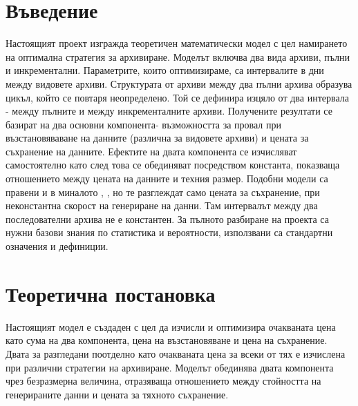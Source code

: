 \documentclass[11pt, a4paper]{article}
\theoremstyle{definition}
\begin{document}
\section{Въведение}
		Настоящият проект изгражда теоретичен математически модел с цел намирането на оптимална стратегия за архивиране. Моделът включва два вида архиви, пълни и инкрементални. Параметрите, които оптимизираме, са интервалите в дни между видовете архиви. Структурата от архиви между два пълни архива образува цикъл, който се повтаря неопределено. Той се дефинира изцяло от два интервала - между пълните и между инкременталните архиви. Получените резултати се базират на два основни компонента- възможността за провал при възстановяваване на данните (различна за видовете архиви) и цената за съхранение на данните. Ефектите на двата компонента се изчисляват самостоятелно като след това се обединяват посредством константа, показваща отношението между цената на данните и техния размер. Подобни модели са правени и в миналото \cite{qian2010optimal}, \cite{nakamura2003optimal}, но те разглеждат само цената за съхранение, при неконстантна скорост на генериране на данни. Там интервалът между два последователни архива не е константен. За пълното разбиране на проекта са нужни базови знания по статистика и вероятности, използвани са стандартни означения и дефиниции.

\section{Теоретична постановка}
	Настоящият модел е създаден с цел да изчисли и оптимизира очакваната цена като сума на два компонента, цена на възстановяване и цена на съхранение. Двата за разгледани поотделно като очакваната цена за всеки от тях е изчислена при различни стратегии на архивиране. Моделът обединява двата компонента чрез безразмерна величина, отразяваща отношението между стойността на генерираните данни и цената за тяхното съхранение.
\end{document}
